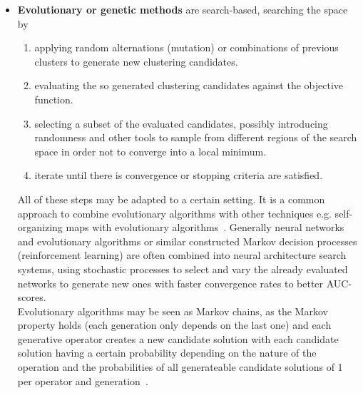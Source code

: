 \begin{itemize}
    \item \textbf{Evolutionary or genetic methods} are search-based, searching the space by 
        \begin{enumerate}
            \item applying random alternations (mutation) or combinations of previous clusters to generate new clustering candidates.
            \item evaluating the so generated clustering candidates against the objective function.
            \item selecting a subset of the evaluated candidates, possibly introducing randomness and other tools to sample from different regions of the search space in order not to converge into a local minimum.
            \item iterate until there is convergence or stopping criteria are satisfied.
        \end{enumerate}
        All of these steps may be adapted to a certain setting. It is a common approach to combine evolutionary algorithms with other techniques e.g. self-organizing maps with evolutionary algorithms~\cite{leng2006design}. 
        Generally neural networks and evolutionary algorithms or similar constructed Markov decision processes (reinforcement learning) are often combined into neural architecture search systems, using stochastic processes to select and vary the already evaluated networks to generate new ones with faster convergence rates to better AUC-scores\cite{kandasamy2018neural}. \\
        Evolutionary algorithms may be seen as Markov chains, as the Markov property holds (each generation only depends on the last one) and each generative operator creates a new candidate solution with each candidate solution having a certain probability depending on the nature of the operation and the probabilities of all generateable candidate solutions of 1 per operator and generation~\cite{Nix1992}.
\end{itemize}





